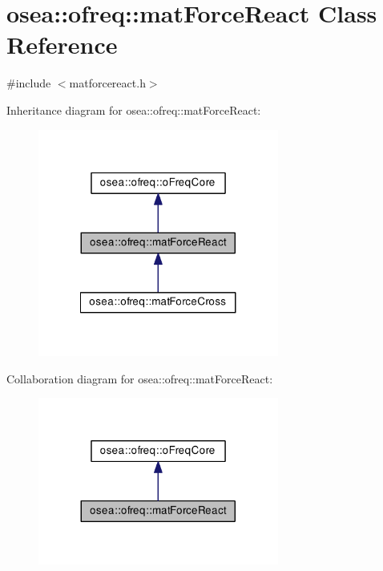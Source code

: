 \hypertarget{classosea_1_1ofreq_1_1mat_force_react}{\section{osea\-:\-:ofreq\-:\-:mat\-Force\-React Class Reference}
\label{classosea_1_1ofreq_1_1mat_force_react}
}


{\ttfamily \#include $<$matforcereact.\-h$>$}



Inheritance diagram for osea\-:\-:ofreq\-:\-:mat\-Force\-React\-:
\nopagebreak
\begin{figure}[H]
\begin{center}
\leavevmode
\includegraphics[width=224pt]{classosea_1_1ofreq_1_1mat_force_react__inherit__graph}
\end{center}
\end{figure}


Collaboration diagram for osea\-:\-:ofreq\-:\-:mat\-Force\-React\-:
\nopagebreak
\begin{figure}[H]
\begin{center}
\leavevmode
\includegraphics[width=224pt]{classosea_1_1ofreq_1_1mat_force_react__coll__graph}
\end{center}
\end{figure}
